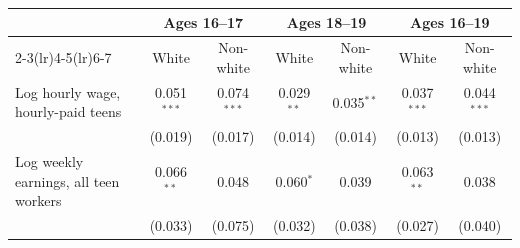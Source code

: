 \begin{tabular}{lcccccc}
\toprule
 & \multicolumn{2}{c}{Ages 16--17} & \multicolumn{2}{c}{Ages 18--19} & \multicolumn{2}{c}{Ages 16--19} \\
\cmidrule(lr){2-3}\cmidrule(lr){4-5}\cmidrule(lr){6-7}
 & White & Non-white & White & Non-white & White & Non-white \\
\midrule
Log hourly wage, hourly-paid teens & 0.051$^{***}$ & 0.074$^{***}$ & 0.029$^{**}$ & 0.035$^{**}$ & 0.037$^{***}$ & 0.044$^{***}$ \\
 & (0.019) & (0.017) & (0.014) & (0.014) & (0.013) & (0.013) \\
Log weekly earnings, all teen workers & 0.066$^{**}$ & 0.048 & 0.060$^{*}$ & 0.039 & 0.063$^{**}$ & 0.038 \\
 & (0.033) & (0.075) & (0.032) & (0.038) & (0.027) & (0.040) \\
\bottomrule
\end{tabular}
